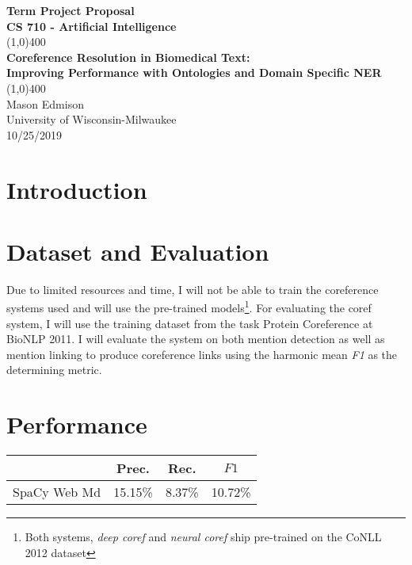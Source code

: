 \documentclass[11pt]{article}
\begin{document}
\begin{titlepage}
\begin{center}
\Large{\textbf{Term Project Proposal}} \\
\Large{\textbf{CS 710 - Artificial Intelligence}} \\

\vfill
\line(1,0){400} \\

\Large{\textbf{Coreference Resolution in Biomedical Text:}} \\
\Large{\textbf{Improving Performance with Ontologies and Domain Specific NER}} \\

\line(1,0){400}\\
\vfill
Mason Edmison\\
University of Wisconsin-Milwaukee\\
10/25/2019
\end{center}
\end{titlepage}

\section{Introduction}


\section{Dataset and Evaluation}
Due to limited resources and time, I will not be able to train the coreference systems used and will use the pre-trained models\footnote{Both systems, \emph{deep coref} and \emph{neural coref} ship pre-trained on the CoNLL 2012 dataset}. For evaluating the  coref system, I will use the training dataset from the task Protein Coreference at BioNLP 2011. I will evaluate the system on both mention detection as well as mention linking to produce coreference links using the harmonic mean \emph{F1} as the determining metric. 

\section{Performance}
\begin{center}
 \begin{tabular}{||c c c c||} 
 \hline
  &  Prec.  & Rec. & $F1$ \\ [0.5ex] 
 \hline\hline
     SpaCy Web Md & 15.15\% & 8.37\% & 10.72\% \\ 
 \hline
\end{tabular}
\end{center}

\newpage



\nocite{pilehvar-collier-2016-improved, choi-etal-2014-analysis, Prokofyev:2015:SOC:2942298.2942337, 95e005df001d47be8468f24479845109,clark-manning-2016-improving}
\end{document}
